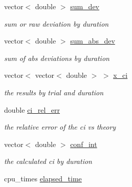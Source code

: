 \begin{DoxyCompactItemize}
vector$<$ double $>$ \mbox{\hyperlink{structKappaResult_a133a1322d9761ce51027209c1b344693}{sum\+\_\+dev}}
\begin{DoxyCompactList}\small\item\em sum or raw deviation by duration \end{DoxyCompactList}\item 
\mbox{\label{structKappaResult_ab68b3871ee5609c7891ca97336e4e5ce}} 
vector$<$ double $>$ \mbox{\hyperlink{structKappaResult_ab68b3871ee5609c7891ca97336e4e5ce}{sum\+\_\+abs\+\_\+dev}}
\begin{DoxyCompactList}\small\item\em sum of abs deviations by duration \end{DoxyCompactList}\item 
\mbox{\label{structKappaResult_a8680d7947e3911486a4b02403bb4de7c}} 
vector$<$ vector$<$ double $>$ $>$ \mbox{\hyperlink{structKappaResult_a8680d7947e3911486a4b02403bb4de7c}{x\+\_\+ci}}
\begin{DoxyCompactList}\small\item\em the results by trial and duration \end{DoxyCompactList}\item 
\mbox{\label{structKappaResult_ae4cbee7f19b10054eec20a22d4cfee02}} 
double \mbox{\hyperlink{structKappaResult_ae4cbee7f19b10054eec20a22d4cfee02}{ci\+\_\+rel\+\_\+err}}
\begin{DoxyCompactList}\small\item\em the relative error of the ci vs theory \end{DoxyCompactList}\item 
\mbox{\label{structKappaResult_af0a62f7129da61d2fa8cb5107404a6f4}} 
vector$<$ double $>$ \mbox{\hyperlink{structKappaResult_af0a62f7129da61d2fa8cb5107404a6f4}{conf\+\_\+int}}
\begin{DoxyCompactList}\small\item\em the calculated ci by duration \end{DoxyCompactList}\item 
\mbox{\label{structKappaResult_abe1e9dba96dd6eeaef8e34ad73cd5ba8}} 
cpu\+\_\+times \mbox{\hyperlink{structKappaResult_abe1e9dba96dd6eeaef8e34ad73cd5ba8}{elapsed\+\_\+time}}

\end{DoxyCompactItemize}
